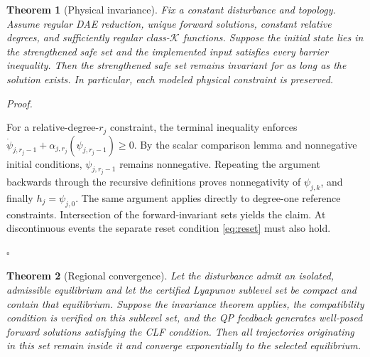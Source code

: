 \documentclass[11pt,twocolumn]{article}
\newtheorem{theorem}{Theorem}
\newenvironment{proof}{\par\noindent\textit{Proof.}\ }{\hfill$\square$\par}
\begin{document}
\label{subsec:guarantees}

\begin{theorem}[Physical invariance]

Fix a constant disturbance and topology. Assume regular DAE reduction, unique forward solutions, constant relative degrees, and sufficiently regular class-$\mathcal K$ functions. Suppose the initial state lies in the strengthened safe set and the implemented input satisfies every barrier inequality. Then the strengthened safe set remains invariant for as long as the solution exists. In particular, each modeled physical constraint is preserved.

\end{theorem}

\begin{proof}

For a relative-degree-$r_j$ constraint, the terminal inequality enforces $\dot\psi_{j,r_j-1}+\alpha_{j,r_j}(\psi_{j,r_j-1})\geq0$. By the scalar comparison lemma and nonnegative initial conditions, $\psi_{j,r_j-1}$ remains nonnegative. Repeating the argument backwards through the recursive definitions proves nonnegativity of $\psi_{j,k}$, and finally $h_j=\psi_{j,0}$. The same argument applies directly to degree-one reference constraints. Intersection of the forward-invariant sets yields the claim. At discontinuous events the separate reset condition \eqref{eq:reset} must also hold.

\end{proof}

\begin{theorem}[Regional convergence]

Let the disturbance admit an isolated, admissible equilibrium and let the certified Lyapunov sublevel set be compact and contain that equilibrium. Suppose the invariance theorem applies, the compatibility condition is verified on this sublevel set, and the QP feedback generates well-posed forward solutions satisfying the CLF condition. Then all trajectories originating in this set remain inside it and converge exponentially to the selected equilibrium.

\end{theorem}
\end{document}
